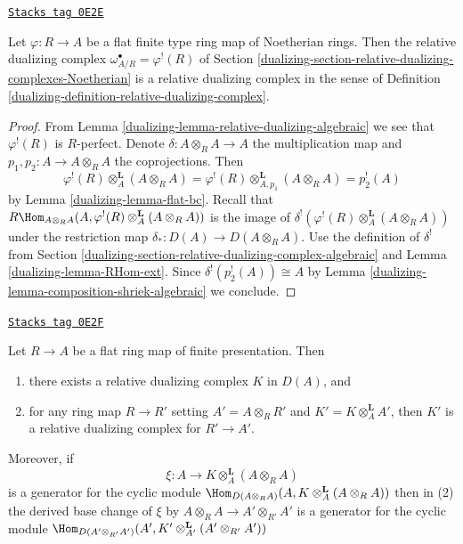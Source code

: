 \begin{lemma}
\label{dualizing-lemma-relative-dualizing-noetherian}
\href{https://stacks.math.columbia.edu/tag/0E2E}{\texttt{Stacks tag 0E2E}}

Let $\varphi : R \to A$ be a flat finite type ring map of Noetherian rings.
Then the relative dualizing complex $\omega_{A/R}^\bullet = \varphi^!(R)$
of Section \ref{dualizing-section-relative-dualizing-complexes-Noetherian}
is a relative dualizing complex in the sense of
Definition \ref{dualizing-definition-relative-dualizing-complex}.
\end{lemma}

\begin{proof}

From Lemma \ref{dualizing-lemma-relative-dualizing-algebraic} we see that
$\varphi^!(R)$ is $R$-perfect.
Denote $\delta : A \otimes_R A \to A$ the multiplication map
and $p_1, p_2 : A \to A \otimes_R A$ the coprojections.
Then
$$
\varphi^!(R) \otimes_A^\mathbf{L} (A \otimes_R A) =
\varphi^!(R) \otimes_{A, p_1}^\mathbf{L} (A \otimes_R A) =
p_2^!(A)
$$
by Lemma \ref{dualizing-lemma-flat-bc}. Recall that
$
R\Hom_{A \otimes_R A}(A, \varphi^!(R) \otimes_A^\mathbf{L} (A \otimes_R A))
$
is the image of $\delta^!(\varphi^!(R) \otimes_A^\mathbf{L} (A \otimes_R A))$
under the restriction map $\delta_* : D(A) \to D(A \otimes_R A)$.
Use the definition of $\delta^!$ from
Section \ref{dualizing-section-relative-dualizing-complex-algebraic}
and Lemma \ref{dualizing-lemma-RHom-ext}.
Since $\delta^!(p_2^!(A)) \cong A$ by
Lemma \ref{dualizing-lemma-composition-shriek-algebraic}
we conclude.
\end{proof}

\begin{lemma}
\label{dualizing-lemma-base-change-relative-dualizing}
\href{https://stacks.math.columbia.edu/tag/0E2F}{\texttt{Stacks tag 0E2F}}

Let $R \to A$ be a flat ring map of finite presentation. Then
\begin{enumerate}
\item there exists a relative dualizing complex $K$ in $D(A)$, and
\item for any ring map $R \to R'$ setting $A' = A \otimes_R R'$
and $K' = K \otimes_A^\mathbf{L} A'$, then $K'$ is a
relative dualizing complex for $R' \to A'$.
\end{enumerate}
Moreover, if
$$
\xi : A \longrightarrow K \otimes_A^\mathbf{L} (A \otimes_R A)
$$
is a generator for the cyclic module
$\Hom_{D(A \otimes_R A)}(A, K \otimes_A^\mathbf{L} (A \otimes_R A))$
then in (2) the derived base change of $\xi$ by
$A \otimes_R A \to A' \otimes_{R'} A'$ is a generator for
the cyclic module
$\Hom_{D(A' \otimes_{R'} A')}(A',
K' \otimes_{A'}^\mathbf{L} (A' \otimes_{R'} A'))$
\end{lemma}

